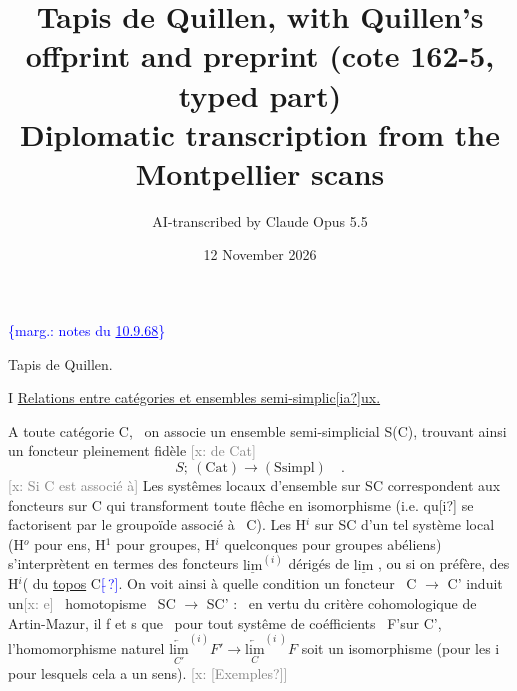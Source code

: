 \documentclass[11pt]{article}
\title{Tapis de Quillen, with Quillen's offprint and preprint (cote 162-5, typed part)\\[4pt]\large Diplomatic transcription from the Montpellier scans}
\author{AI-transcribed by Claude Opus 5.5}
\date{12 November 2026}
\newcommand{\scanpage}[1]{\par\bigskip\noindent{\small\sffamily[scan #1]}\par}
\newcommand{\mspage}[1]{{\small\sffamily[p.\,#1]}}
\newcommand{\hand}[1]{\textcolor{blue}{#1}}
\newcommand{\margin}[1]{\textcolor{blue}{\{\textsf{marg.:} #1\}}}
\newcommand{\xout}[1]{\textcolor{gray}{[\textsf{x:} #1]}}
\newcommand{\uline}[1]{\underline{#1}}
\newcommand{\unsure}[1]{[#1?]}
\begin{document}
\maketitle

\scanpage{162-5/2}
\mspage{\hand{1}} \margin{notes du \uline{10.9.68}}

Tapis de Quillen.

I \quad \uline{Relations entre catégories et ensembles semi-simplic\unsure{ia}ux.}

A toute catégorie C, \ on associe un ensemble semi-simplicial S(C),
trouvant ainsi un foncteur pleinement fidèle \xout{de Cat}
\[ S;\ (\mathrm{Cat}) \longrightarrow (\mathrm{Ssimpl}) \quad . \]
\xout{Si C est associé à} Les systêmes locaux d'ensemble sur SC correspondent
aux foncteurs sur C qui transforment toute flêche en isomorphisme (i.e.
qu\unsure{i} se factorisent par le groupoïde associé à \ C). Les H$^{i}$ sur SC d'un tel
système local (H$^{o}$ pour ens, H$^{1}$ pour groupes, H$^{i}$ quelconques pour groupes
abéliens) s'interprètent en termes des foncteurs $\uline{\mathrm{lim}}^{(i)}$ dérigés de $\uline{\mathrm{lim}}$ ,
ou si on préfère, des H$^{i}$( du \uline{topos} C\hand{\unsure{$\widetilde{\ }$}}. On voit ainsi à quelle condition
un foncteur \ C $\longrightarrow$ C' induit un\xout{e} \ homotopisme \ SC $\longrightarrow$ SC' : \ en vertu du
critère cohomologique de Artin-Mazur, il f et s que \ pour tout systême
de coéfficients \ F'sur C', l'homomorphisme naturel $\underset{C'}{\underleftarrow{\mathrm{lim}}}^{(i)}F' \longrightarrow \underset{C}{\underleftarrow{\mathrm{lim}}}^{(i\ )}F$
soit un isomorphisme (pour les i pour lesquels cela a un sens). \xout{\unsure{Exemples}}
\end{document}
